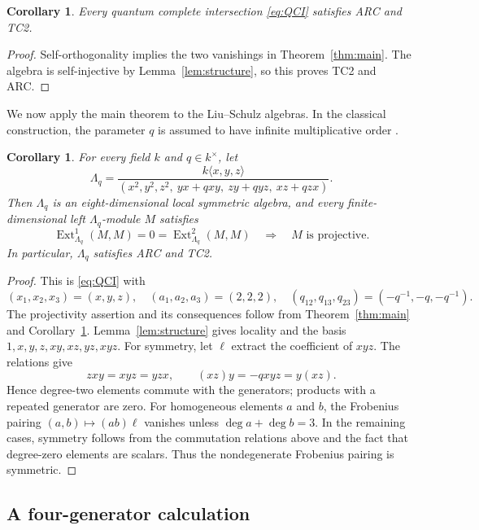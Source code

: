 \documentclass[11pt,a4paper]{article}
\numberwithin{equation}{section}
\theoremstyle{definition}
\theoremstyle{plain}
\newtheorem{corollary}[definition]{Corollary}
\theoremstyle{remark}
\DeclareMathOperator{\Ext}{Ext}
\begin{document}
\begin{corollary}\label{cor:ARC}
Every quantum complete intersection \eqref{eq:QCI} satisfies ARC and TC2.
\end{corollary}

\begin{proof}
Self-orthogonality implies the two vanishings in Theorem~\ref{thm:main}.
The algebra is self-injective by Lemma~\ref{lem:structure}, so this
proves TC2 and ARC.
\end{proof}

We now apply the main theorem to the Liu--Schulz algebras.
In the classical construction, the parameter \(q\) is assumed
to have infinite multiplicative order
\cite[Section 6]{CPX12}.

\begin{corollary}\label{cor:LS}
For every field \(k\) and \(q\in k^\times\), let
\[
 \Lambda_q=
 \frac{k\langle x,y,z\rangle}
 {(x^2,y^2,z^2,\ yx+qxy,\ zy+qyz,\ xz+qzx)}.
\]
Then \(\Lambda_q\) is an eight-dimensional local symmetric algebra, and
every finite-dimensional left \(\Lambda_q\)-module \(M\) satisfies
\[
 \Ext_{\Lambda_q}^1(M,M)=0=\Ext_{\Lambda_q}^2(M,M)
 \quad\Longrightarrow\quad M\text{ is projective}.
\]
In particular, \(\Lambda_q\) satisfies ARC and TC2.
\end{corollary}

\begin{proof}
This is \eqref{eq:QCI} with
\[
 (x_1,x_2,x_3)=(x,y,z),\quad (a_1,a_2,a_3)=(2,2,2),\quad
 (q_{12},q_{13},q_{23})=(-q^{-1},-q,-q^{-1}).
\]
The projectivity assertion and its consequences follow from
Theorem~\ref{thm:main} and Corollary~\ref{cor:ARC}.
Lemma~\ref{lem:structure} gives locality and the basis
\(1,x,y,z,xy,xz,yz,xyz\).
For symmetry, let \(\ell\) extract the coefficient of \(xyz\).
The relations give
\[
 zxy=xyz=yzx,\qquad (xz)y=-qxyz=y(xz).
\]
Hence degree-two elements commute with the generators;
products with a repeated generator are zero.
For homogeneous elements \(a\) and \(b\), the Frobenius pairing
\((a,b)\mapsto(ab)\ell\) vanishes unless
\(\deg a+\deg b=3\).
In the remaining cases, symmetry follows from the commutation
relations above and the fact that degree-zero elements are scalars.
Thus the nondegenerate Frobenius pairing is symmetric.
\end{proof}

\subsection{A four-generator calculation}\label{subsec:four}
\end{document}
